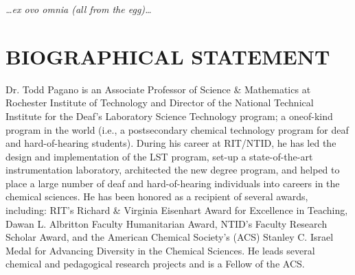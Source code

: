 \documentclass[11.5pt]{sig-alternate} %
\begin{document}
\begin{large}
\textit{…ex ovo omnia (all from the egg)…}

\section*{BIOGRAPHICAL STATEMENT}

Dr. Todd Pagano is an Associate Professor of Science \& Mathematics at Rochester Institute of Technology and Director of the National Technical Institute for  the Deaf’s Laboratory Science Technology program; a oneof-kind program in the world (i.e., a postsecondary chemical technology program for deaf and hard-of-hearing students). During his career at RIT/NTID, he has led the design and implementation of the LST program, set-up a state-of-the-art instrumentation laboratory, architected the new degree program, and helped to place a large number of deaf and hard-of-hearing individuals into careers in the chemical sciences. He has been honored as a recipient of several awards, including: RIT’s Richard \& Virginia Eisenhart Award for Excellence in Teaching, Dawan L. Albritton Faculty Humanitarian Award, NTID’s Faculty Research Scholar Award, and the American Chemical Society’s (ACS) Stanley C. Israel Medal for Advancing Diversity in the Chemical Sciences. He leads several chemical and pedagogical research projects and is a Fellow of the ACS.

\end{large}
\end{document}
